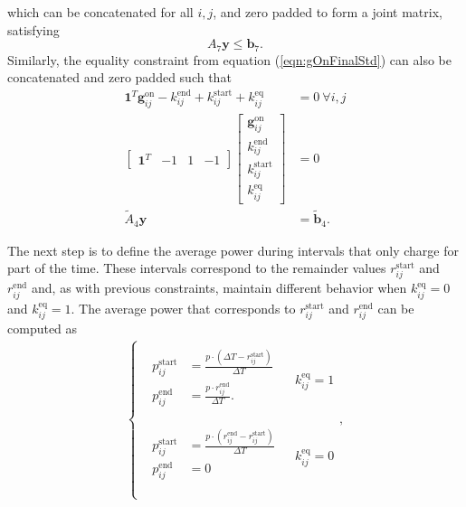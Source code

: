 which can be concatenated for all $i,j$, and zero padded to form a joint matrix, satisfying 
\begin{equation}
	A_7\mathbf{y} \le \mathbf{b}_7.
\end{equation}
Similarly, the equality constraint from equation (\eqref{eqn:gOnFinalStd}) can also be concatenated and zero padded such that
\begin{equation} \begin{aligned}
	\mathbf{1}^T\mathbf{g}_{ij}^{\text{on}} - k_{ij}^{\text{end}} + k_{ij}^{\text{start}} + k_{ij}^{\text{eq}} &= 0 \ \forall i,j\\
	\begin{bmatrix}\mathbf{1}^T & - 1 & 1 & -1\end{bmatrix} \begin{bmatrix}\mathbf{g}_{ij}^{\text{on}} \\ k_{ij}^{\text{end}} \\ k_{ij}^{\text{start}} \\ k_{ij}^{\text{eq}} \end{bmatrix} &= 0 \\
		\tilde{A}_4\mathbf{y} &= \tilde{\mathbf{b}}_4.
\end{aligned} \end{equation}
	\par The next step is to define the average power during intervals that only charge for part of the time.  These intervals correspond to the remainder values $r_{ij}^{\text{start}}$ and $r_{ij}^{\text{end}}$ and, as with previous constraints, maintain different behavior when $k_{ij}^{\text{eq}} = 0$ and $k_{ij}^{\text{eq}} = 1$. The average power that corresponds to $r_{ij}^{\text{start}}$ and $r_{ij}^{\text{end}}$ can be computed as 
\begin{equation}\label{eqn:avgPower1}\begin{aligned}
	\begin{cases}
	\begin{array}{l} \begin{aligned}
		p^{\text{start}}_{ij} &= \frac{p\cdot (\Delta T - r^{\text{start}}_{ij})}{\Delta T}\\ 
		p^{\text{end}}_{ij} &= \frac{p\cdot r^{\text{end}}_{ij}}{\Delta T}.\\
	\end{aligned} \end{array} & k_{ij}^{\text{eq}} = 1 \\[8pt] 
	\begin{array}{l} \begin{aligned}
		p_{ij}^{\text{start}} &= \frac{p\cdot \left ( r_{ij}^{\text{end}} - r_{ij}^{\text{start}} \right )}{\Delta T} \\
		p_{ij}^{\text{end}} &= 0 \\
	\end{aligned} \end{array} & k_{ij}^{\text{eq}} = 0 \\
	\end{cases},
\end{aligned}\end{equation}
